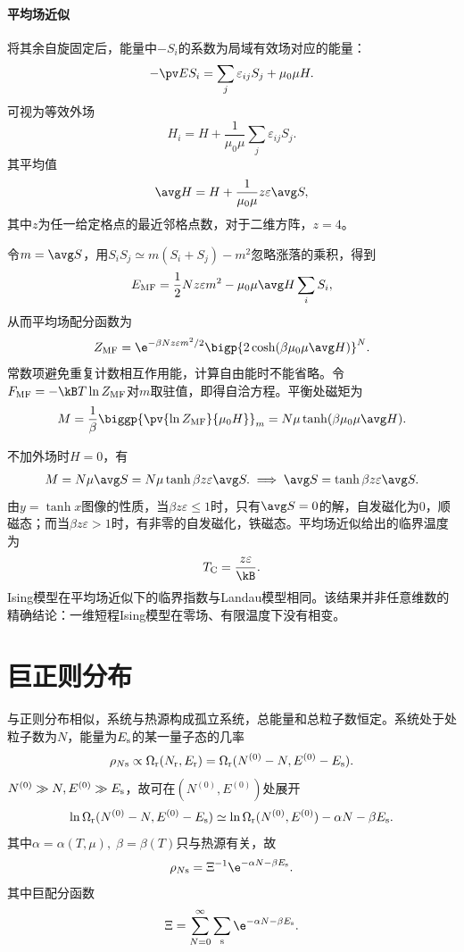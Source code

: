 \paragraph{平均场近似}将其余自旋固定后，能量中$-S_i$的系数为局域有效场对应的能量：
\[
	-\pv E{S_i}=\sum_j\varepsilon_{ij}S_j+\mu_0\mu H.
\]
可视为等效外场
\[
	H_i=H+\frac1{\mu_0\mu}\sum_j\varepsilon_{ij}S_j.
\]
其平均值
\[
	\avg H=H+\frac1{\mu_0\mu}z\varepsilon\avg S,
\]
其中$z$为任一给定格点的最近邻格点数，对于二维方阵，$z=4$。

令$m=\avg S$，用$S_iS_j\simeq m(S_i+S_j)-m^2$忽略涨落的乘积，得到
\[
	E_{\mathrm{MF}}=\frac12Nz\varepsilon m^2-\mu_0\mu\avg H\sum_iS_i,
\]
从而平均场配分函数为
\[
	Z_{\mathrm{MF}}=\e^{-\beta Nz\varepsilon m^2/2}\bigp{2\cosh(\beta\mu_0\mu\avg H)}^N.
\]
常数项避免重复计数相互作用能，计算自由能时不能省略。令$F_{\mathrm{MF}}=-\kB T\ln Z_{\mathrm{MF}}$对$m$取驻值，即得自洽方程。平衡处磁矩为
\begin{align}
	M=\frac1\beta\biggp{\pv{\ln Z_{\mathrm{MF}}}{\mu_0 H}}_m=N\mu\tanh(\beta\mu_0\mu\avg H).
\end{align}

不加外场时$H=0$，有
\begin{align}
	M=N\mu\avg S=N\mu\tanh\beta z\varepsilon\avg S.\implies\avg S=\tanh\beta z\varepsilon\avg S.
\end{align}
由$y=\tanh x$图像的性质，当$\beta z\varepsilon\leqslant 1$时，只有$\avg S=0$的解，自发磁化为0，顺磁态；而当$\beta z\varepsilon>1$时，有非零的自发磁化，铁磁态。平均场近似给出的临界温度为
\begin{align}
	T_\Cr=\frac{z\varepsilon}\kB.
\end{align}
Ising模型在平均场近似下的临界指数与Landau模型相同。该结果并非任意维数的精确结论：一维短程Ising模型在零场、有限温度下没有相变。
\section{巨正则分布}

与正则分布相似，系统与热源构成孤立系统，总能量和总粒子数恒定。系统处于处粒子数为$N$，能量为$E_\mathrm s$的某一量子态的几率
\[
	\rho_{N\mathrm s}\propto\Omega_\mathrm r(N_\mathrm r,E_\mathrm r)=\Omega_\mathrm r(N^{(0)}-N,E^{(0)}-E_\mathrm s).
\]
$N^{(0)}\gg N,E^{(0)}\gg E_\mathrm s$，故可在$(N^{(0)},E^{(0)})$处展开
\[
	\ln\Omega_\mathrm r(N^{(0)}-N,E^{(0)}-E_\mathrm s)\simeq\ln\Omega_\mathrm r(N^{(0)},E^{(0)})-\alpha N-\beta E_\mathrm s.
\]
其中$\alpha=\alpha(T,\mu),\;\beta=\beta(T)$只与热源有关，故
\begin{align}
	\rho_{N\st}=\Xi^{-1}\e^{-\alpha N-\beta E_\st}.
\end{align}
其中巨配分函数
\begin{align}
	\Xi=\sum_{N=0}^\infty\sum_\st\e^{-\alpha N-\beta E_\st}.
\end{align}

